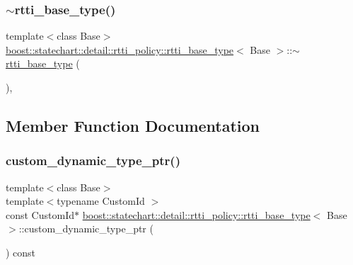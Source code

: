 \subsubsection{\texorpdfstring{$\sim$rtti\+\_\+base\+\_\+type()}{~rtti\_base\_type()}}
{\footnotesize\ttfamily template$<$class Base$>$ \\
\mbox{\hyperlink{classboost_1_1statechart_1_1detail_1_1rtti__policy_1_1rtti__base__type}{boost\+::statechart\+::detail\+::rtti\+\_\+policy\+::rtti\+\_\+base\+\_\+type}}$<$ Base $>$\+::$\sim$\mbox{\hyperlink{classboost_1_1statechart_1_1detail_1_1rtti__policy_1_1rtti__base__type}{rtti\+\_\+base\+\_\+type}} (\begin{DoxyParamCaption}{ }\end{DoxyParamCaption})\hspace{0.3cm}{\ttfamily [inline]}, {\ttfamily [protected]}}



\subsection{Member Function Documentation}
\mbox{\label{classboost_1_1statechart_1_1detail_1_1rtti__policy_1_1rtti__base__type_aba3e05475b829d99bff210472232121f}} 
\subsubsection{\texorpdfstring{custom\+\_\+dynamic\+\_\+type\+\_\+ptr()}{custom\_dynamic\_type\_ptr()}}
{\footnotesize\ttfamily template$<$class Base$>$ \\
template$<$typename Custom\+Id $>$ \\
const Custom\+Id$\ast$ \mbox{\hyperlink{classboost_1_1statechart_1_1detail_1_1rtti__policy_1_1rtti__base__type}{boost\+::statechart\+::detail\+::rtti\+\_\+policy\+::rtti\+\_\+base\+\_\+type}}$<$ Base $>$\+::custom\+\_\+dynamic\+\_\+type\+\_\+ptr (\begin{DoxyParamCaption}{ }\end{DoxyParamCaption}) const\hspace{0.3cm}{\ttfamily [inline]}}

